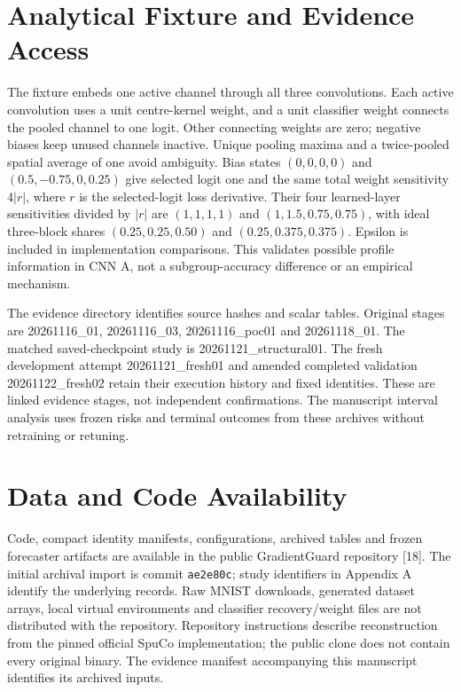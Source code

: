 \section{Analytical Fixture and Evidence Access}
\label{app:fixture}
The fixture embeds one active channel through all three convolutions. Each active convolution uses a unit centre-kernel weight, and a unit classifier weight connects the pooled channel to one logit. Other connecting weights are zero; negative biases keep unused channels inactive. Unique pooling maxima and a twice-pooled spatial average of one avoid ambiguity. Bias states $(0,0,0,0)$ and $(0.5,-0.75,0,0.25)$ give selected logit one and the same total weight sensitivity $4|r|$, where $r$ is the selected-logit loss derivative. Their four learned-layer sensitivities divided by $|r|$ are $(1,1,1,1)$ and $(1,1.5,0.75,0.75)$, with ideal three-block shares $(0.25,0.25,0.50)$ and $(0.25,0.375,0.375)$. Epsilon is included in implementation comparisons. This validates possible profile information in CNN A, not a subgroup-accuracy difference or an empirical mechanism.

The evidence directory identifies source hashes and scalar tables. Original stages are 20261116\_01, 20261116\_03, 20261116\_poc01 and 20261118\_01. The matched saved-checkpoint study is 20261121\_structural01. The fresh development attempt 20261121\_fresh01 and amended completed validation 20261122\_fresh02 retain their execution history and fixed identities. These are linked evidence stages, not independent confirmations. The manuscript interval analysis uses frozen risks and terminal outcomes from these archives without retraining or retuning.

\section*{Data and Code Availability}
Code, compact identity manifests, configurations, archived tables and frozen forecaster artifacts are available in the public GradientGuard repository [18]. The initial archival import is commit \texttt{ae2e80c}; study identifiers in Appendix A identify the underlying records. Raw MNIST downloads, generated dataset arrays, local virtual environments and classifier recovery/weight files are not distributed with the repository. Repository instructions describe reconstruction from the pinned official SpuCo implementation; the public clone does not contain every original binary. The evidence manifest accompanying this manuscript identifies its archived inputs.

